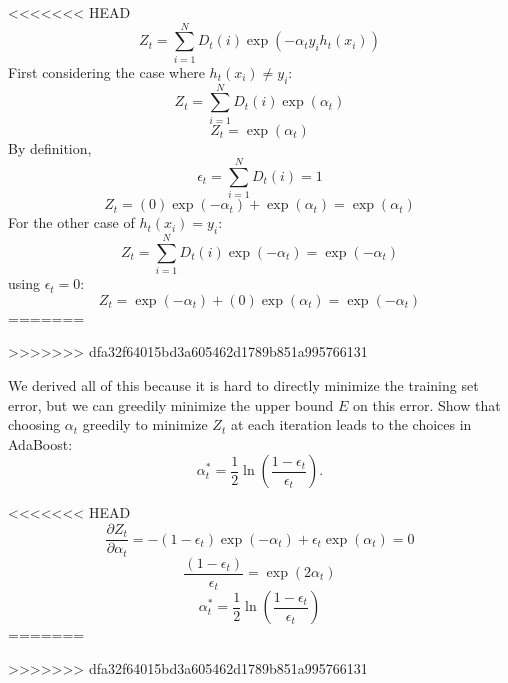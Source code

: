 \begin{solution}
<<<<<<< HEAD
	\begin{equation}
        Z_t = \sum\limits_{i=1}^N D_t(i) \exp(-\alpha_{t}y_{i}h_{t}(x_{i}))
    \end{equation}
    First considering the case where $h_t(x_i)\neq y_i$:
    \begin{equation}
        Z_t = \sum\limits_{i=1}^N D_t(i) \exp(\alpha_{t})
    \end{equation}
    \begin{equation}
        Z_t = \exp(\alpha_{t})
    \end{equation}
    By definition,
    \begin{equation}
        \epsilon_t = \sum\limits_{i=1}^N D_t(i) = 1
    \end{equation}
    \begin{equation}
        Z_t = (0)\exp(-\alpha_t)+\exp(\alpha_t)=\exp(\alpha_t)
    \end{equation}
    For the other case of $h_t(x_i)= y_i$:
    \begin{equation}
        Z_t = \sum\limits_{i=1}^N D_t(i) \exp(-\alpha_{t})=\exp(-\alpha_{t})
    \end{equation}
    using $\epsilon_t=0$:
    \begin{equation}
        Z_t = \exp(-\alpha_t)+(0)\exp(\alpha_t)=\exp(-\alpha_t)
    \end{equation}
=======
	
>>>>>>> dfa32f64015bd3a605462d1789b851a995766131
\end{solution}

\problem[2]
We derived all of this because it is hard to directly minimize the training set error, but we can greedily minimize the upper bound $E$ on this error. Show that choosing $\alpha_t$
greedily to minimize $Z_t$ at each iteration leads to the choices in
AdaBoost:
$$\alpha_{t}^* = \frac{1}{2} \ln \left(\frac{1 - \epsilon_t}{\epsilon_t} \right).$$

\begin{solution}
<<<<<<< HEAD
    \begin{equation}
        \frac{\partial Z_t}{\partial\alpha_t} = -(1-\epsilon_t)\exp(-\alpha_t)+\epsilon_t\exp(\alpha_t) = 0
    \end{equation}
    \begin{equation}
        \frac{(1-\epsilon_t)}{\epsilon_t} = \exp(2\alpha_t)
    \end{equation}
    \begin{equation}
        \alpha_t^* = \frac{1}{2}\ln \left(\frac{1 - \epsilon_t}{\epsilon_t} \right)
    \end{equation}
=======
	
>>>>>>> dfa32f64015bd3a605462d1789b851a995766131
\end{solution}

